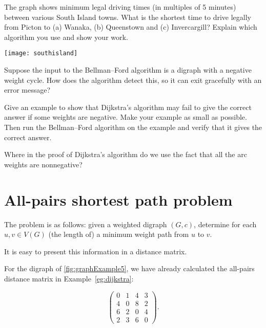 \begin{Exercise}\label{ex:dijk-SI}
The graph shows minimum legal driving times (in multiples of 5 minutes) 
between various South Island towns. What is the shortest time to drive legally from
Picton to (a) Wanaka, (b) Queenstown and (c) Invercargill? Explain which
algorithm you use and show your work.
\begin{center}
\texttt{[image: southisland]}
\end{center}
\end{Exercise}

\begin{Exercise}\label{ex:bellman-neg-cycle}
Suppose the input to the Bellman--Ford algorithm is a digraph with a
negative weight cycle. How does the algorithm detect this, so it can
exit gracefully with an error message?
\end{Exercise}

\begin{Exercise}\label{ex:dijk-neg-fails}
Give an example to show that Dijkstra's algorithm may fail to give the
correct answer if some weights are negative. Make your example as small as
possible. Then run the Bellman--Ford algorithm on the example and verify
that it gives the correct answer.
\end{Exercise}

\begin{Exercise}
\label{ex:dijk-proof}
Where in the proof of Dijkstra's algorithm do we use the fact that 
all the arc weights are nonnegative?
\end{Exercise}



\chapter{All-pairs shortest path problem}
\label{sec:APSP}

The problem is as follows: given a weighted digraph $(G, c)$, determine
for each $u, v\in V(G)$ (the length of) a minimum weight path from $u$
to $v$.

It is easy to present this information in a distance matrix.

\begin{Example}
\label{eg:APSP}
For the digraph of \cref{fig:graphExample5}, we have already
calculated the all-pairs distance matrix in Example~\ref{eg:dijkstra}:

$$
\left(
\begin{matrix}
0 & 1 & 4 & 3 \\
4 & 0 & 8 & 2 \\
6 & 2 & 0 & 4 \\
2 & 3 & 6 & 0
\end{matrix}
\right).
$$
\end{Example}

